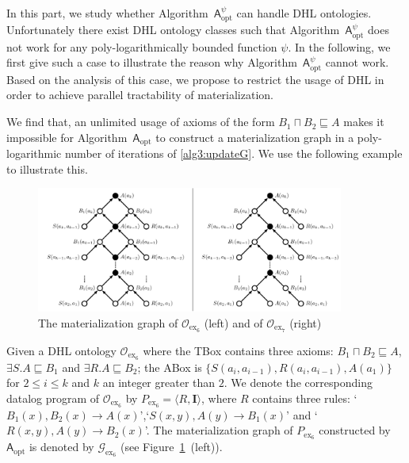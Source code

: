 In this part, we study whether Algorithm~$\mathsf{A}_{\text{opt}}^\psi$ can handle DHL ontologies.
Unfortunately there exist DHL ontology classes such that Algorithm~$\mathsf{A}_{\text{opt}}^\psi$
does not work for any poly-lo\-ga\-rith\-mi\-cal\-ly bounded function $\psi$.
In the following, we first give such a case
to illustrate the reason why Algorithm~$\mathsf{A}_{\text{opt}}^\psi$ cannot work.
Based on the analysis of this case, we propose to restrict
the usage of DHL in order to achieve parallel tractability
of materialization.

We find that, an unlimited usage of axioms of the
form $B_1\sqcap B_2\sqsubseteq A$
makes it impossible for Algorithm~$\mathsf{A}_{\text{opt}}$ to construct a materialization graph
in a poly-logarithmic number of iterations of \ref{alg3:updateG}.
We use the following example to illustrate this.

\begin{figure}[htbp]
\begin{center}
\includegraphics[width=0.9\textwidth]{fig-pathtwist.pdf}
\caption{The materialization graph of $\mathcal{O}_{\text{ex}_6}$
  (left) and of $\mathcal{O}_{\text{ex}_7}$ (right)}
\label{fig:ex3_4}
\end{center}
\end{figure}

\begin{example}\label{exp:dhl}
Given a DHL ontology $\mathcal{O}_{\text{ex}_6}$ where the TBox contains three axioms:
$B_1\sqcap B_2\sqsubseteq A$, $\exists S.A\sqsubseteq B_1$ and $\exists R.A\sqsubseteq B_2$;
the ABox is $\{S(a_i,a_{i-1}), R(a_i,a_{i-1}), A(a_1)\}$
for $2\leq i\leq k$ and $k$ an integer greater than $2$.
We denote the corresponding datalog program of $\mathcal{O}_{\text{ex}_6}$ by $P_{\text{ex}_6}=\langle R, \textbf{I}\rangle$,
where $R$ contains three rules: `$B_1(x),B_2(x)\rightarrow A(x)$',`$S(x,y),A(y)\rightarrow B_1(x)$' and `$R(x,y),A(y)\rightarrow B_2(x)$'.
The materialization graph of $P_{\text{ex}_6}$ constructed by
$\mathsf{A}_{\text{opt}}$ is denoted by $\mathcal{G}_{\text{ex}_6}$
(see Figure~\ref{fig:ex3_4}~(left)).
\end{example}

